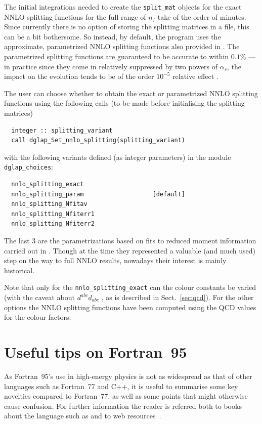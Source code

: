 \documentclass[12pt]{article}
\newcommand{\as}{\alpha_s}
\newcommand{\ttt}[1]{\texttt{#1}}
\begin{document}
The initial integrations needed to create the \ttt{split\_mat} objects
for the exact NNLO splitting functions for the full range of $n_f$
take of the order of minutes.  Since currently there is no option of
storing the splitting matrices in a file, this can be a bit
bothersome. So instead, by default, the program uses the approximate,
parametrized NNLO splitting functions also provided in
\cite{NNLO-NS,NNLO-singlet}. The parametrized splitting functions are
guaranteed to be accurate to within $0.1\%$ --- in practice since they
come in relatively suppressed by two powers of $\as$, the impact on
the evolution tends to be of the order $10^{-5}$ relative effect
\cite{Benchmarks}.

The user can choose whether to obtain the exact or parametrized NNLO
splitting functions using the following calls (to be made before
initialising the splitting matrices)
\begin{lstlisting}
  integer :: splitting_variant
  call dglap_Set_nnlo_splitting(splitting_variant)
\end{lstlisting}
with the following variants defined (as integer parameters) in the
module \ttt{dglap\_choices}:
\begin{lstlisting}
  nnlo_splitting_exact
  nnlo_splitting_param                   [default]
  nnlo_splitting_Nfitav
  nnlo_splitting_Nfiterr1
  nnlo_splitting_Nfiterr2
\end{lstlisting}
The last 3 are the parametrizations based on fits to reduced moment
information carried out in \cite{vanNeerven:1999ca,vanNeerven:2000uj}.
Though at the time they represented a valuable (and much used) step on
the way to full NNLO results, nowadays their interest is mainly
historical.

Note that only for the \ttt{nnlo\_splitting\_exact} can the colour
constants be varied (with the caveat about $d^{abc}d_{abc}$ , as is
described in Sect.~\ref{sec:qcd}). For the other options the
NNLO splitting functions have been computed using the QCD values
for the colour factors.

\section{Useful tips on Fortran~95}
\label{sec:f95appendix}

As Fortran~95's use in high-energy physics is not as widespread as
that of other languages such as Fortran~77 and C++, it is useful to
summarise some key novelties compared to Fortran~77, as well as some
points that might otherwise cause confusion. For further information
the reader is referred both to books about the language such as
\cite{F95Explained} and to web resources~\cite{F95WebResources}.
\end{document}

